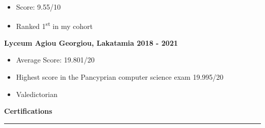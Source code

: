\documentclass[12pt]{article}
\begin{document}
\begin{paracol}{2}
{\begin{itemize}[leftmargin=33pt, itemsep=0pt, topsep=0pt]
            \item Score: 9.55/10\\
            \item Ranked 1\textsuperscript{st} in my cohort\\
         \end{itemize}
      }
      \vspace{0.5cm}
      \textbf{\textcolor{bgcolor}{Lyceum Agiou Georgiou, Lakatamia \hfill 2018 - 2021}}\\[0.5em]
      {\renewcommand{\labelitemi}{\textcolor{bgcolor}{\normalsize$\bullet$}}%
      \begin{itemize}[leftmargin=33pt, itemsep=0pt, topsep=0pt]
            \item Average Score: 19.801/20
            \item Highest score in the Pancyprian computer science exam 19.995/20
            \item Valedictorian
         \end{itemize}
      }
\end{paracol}
\newpage
{}
{\fontsize{14pt}{13pt}\selectfont
   \textbf{\textcolor{bgcolor}{Certifications}}\\[0.3em]
}
\hrule
\vspace{0.5cm}
\end{document}
